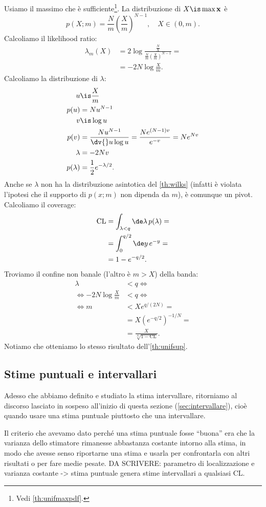 \begin{solution}
	Usiamo il massimo che è sufficiente\footnote{Vedi \autoref{th:unifmaxpdf}.}.
	La distribuzione di $X\is\max\mathbf x$ è
	\begin{equation*}
		p(X;m)
		= \frac Nm \left(\frac Xm\right)^{N-1},
		\quad X \in (0,m).
	\end{equation*}
	Calcoliamo il likelihood ratio:
	\begin{align*}
		\lambda_m(X)
		&= 2\log\frac {\frac NX} {\frac Nm \left(\frac Xm\right)^{N-1}} = \\
		&= -2N\log\frac Xm.
	\end{align*}
	Calcoliamo la distribuzione di $\lambda$:
	\begin{align*}
		u
		&\is \frac Xm \\
		p(u)
		&= N u^{N-1} \\
		v
		&\is \log u \\
		p(v)
		&= \frac{Nu^{N-1}}{\dv{}u\log u}
		= \frac{Ne^{(N-1)v}}{e^{-v}}
		= N e^{Nv} \\
		\lambda
		&= -2Nv \\
		p(\lambda)
		&= \frac 12 e^{-\lambda/2}.
	\end{align*}
	Anche se $\lambda$ non ha la distribuzione asintotica del \autoref{th:wilks}
	(infatti è violata l'ipotesi che il supporto di $p(x;m)$ non dipenda da $m$),
	è comunque un pivot.
	Calcoliamo il coverage:
	\begin{align*}
		\mathrm{CL}
		&= \int_{\lambda<q} \de\lambda\, p(\lambda) = \\
		&= \int_0^{q/2} \de y\, e^{-y} = \\
		&= 1 - e^{-q/2}.
	\end{align*}
	Troviamo il confine non banale (l'altro è $m>X$) della banda:
	\begin{align*}
		\lambda
		&< q \iff \\
		\iff -2N\log\frac Xm
		&< q \iff \\
		\iff m
		&< Xe^{q/(2N)} = \\
		&= X\left(e^{-q/2}\right)^{-1/N} = \\
		&= \frac X {\sqrt[N]{1-\mathrm{CL}}}.
	\end{align*}
	Notiamo che otteniamo lo stesso risultato dell'\autoref{th:unifsup}.
\end{solution}

\subsection{Stime puntuali e intervallari}

Adesso che abbiamo definito e studiato la stima intervallare,
ritorniamo al discorso lasciato in sospeso all'inizio di questa sezione (\ref{sec:intervallare}),
cioè quando usare una stima puntuale piuttosto che una intervallare.

Il criterio che avevamo dato perché una stima puntuale fosse ``buona''
era che la varianza dello stimatore rimanesse abbastanza costante intorno alla stima,
in modo che avesse senso riportarne una stima e usarla per confrontarla con altri risultati
o per fare medie pesate.
DA SCRIVERE: parametro di localizzazione e varianza costante -> stima puntuale genera stime intervallari a qualsiasi CL.
